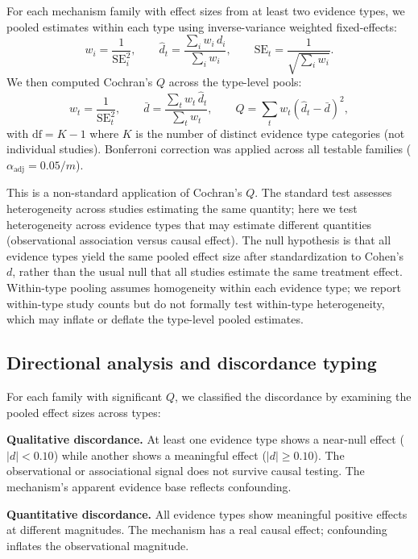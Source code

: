 \documentclass[11pt]{article}
\begin{document}
For each mechanism family with effect sizes from at least two evidence types, we pooled estimates within each type using inverse-variance weighted fixed-effects:
\begin{equation}
w_i = \frac{1}{\text{SE}_i^2}, \qquad
\hat{d}_t = \frac{\sum_i w_i \, d_i}{\sum_i w_i}, \qquad
\text{SE}_t = \frac{1}{\sqrt{\sum_i w_i}}.
\label{eq:pool}
\end{equation}
We then computed Cochran's $Q$ across the type-level pools:
\begin{equation}
w_t = \frac{1}{\text{SE}_t^2}, \qquad
\bar{d} = \frac{\sum_t w_t \, \hat{d}_t}{\sum_t w_t}, \qquad
Q = \sum_t w_t (\hat{d}_t - \bar{d})^2,
\label{eq:Q}
\end{equation}
with $\text{df} = K - 1$ where $K$ is the number of distinct evidence type categories (not individual studies). Bonferroni correction was applied across all testable families ($\alpha_{\text{adj}} = 0.05 / m$).

This is a non-standard application of Cochran's $Q$. The standard test assesses heterogeneity across studies estimating the same quantity; here we test heterogeneity across evidence types that may estimate different quantities (observational association versus causal effect). The null hypothesis is that all evidence types yield the same pooled effect size after standardization to Cohen's $d$, rather than the usual null that all studies estimate the same treatment effect. Within-type pooling assumes homogeneity within each evidence type; we report within-type study counts but do not formally test within-type heterogeneity, which may inflate or deflate the type-level pooled estimates.

\subsection{Directional analysis and discordance typing}

For each family with significant $Q$, we classified the discordance by examining the pooled effect sizes across types:

\textbf{Qualitative discordance.} At least one evidence type shows a near-null effect ($|d| < 0.10$) while another shows a meaningful effect ($|d| \geq 0.10$). The observational or associational signal does not survive causal testing. The mechanism's apparent evidence base reflects confounding.

\textbf{Quantitative discordance.} All evidence types show meaningful positive effects at different magnitudes. The mechanism has a real causal effect; confounding inflates the observational magnitude.
\end{document}
